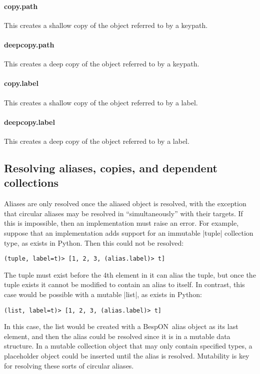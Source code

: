 \documentclass[11pt]{article}
\newcommand{\bespon}{BespON}
\begin{document}
{{\paragraph{copy.path}
This creates a shallow copy of the object referred to by a keypath.

\paragraph{deepcopy.path}
This creates a deep copy of the object referred to by a keypath.

\paragraph{copy.label}
This creates a shallow copy of the object referred to by a label.

\paragraph{deepcopy.label}
This creates a deep copy of the object referred to by a label.




\subsection{Resolving aliases, copies, and dependent collections}

Aliases are only resolved once the aliased object is resolved, with the exception that circular aliases may be resolved in ``simultaneously'' with their targets.  If this is impossible, then an implementation must raise an error.  For example, suppose that an implementation adds support for an immutable |tuple| collection type, as exists in Python.  Then this could not be resolved:
\begin{Verbatim}
(tuple, label=t)> [1, 2, 3, (alias.label)> t]
\end{Verbatim}
The tuple must exist before the 4th element in it can alias the tuple, but once the tuple exists it cannot be modified to contain an alias to itself.  In contrast, this case would be possible with a mutable |list|, as exists in Python:
\begin{Verbatim}
(list, label=t)> [1, 2, 3, (alias.label)> t]
\end{Verbatim}
In this case, the list would be created with a \bespon\ alias object as its last element, and then the alias could be resolved since it is in a mutable data structure.  In a mutable collection object that may only contain specified types, a placeholder object could be inserted until the alias is resolved.  Mutability is key for resolving these sorts of circular aliases.

}}
\end{document}

